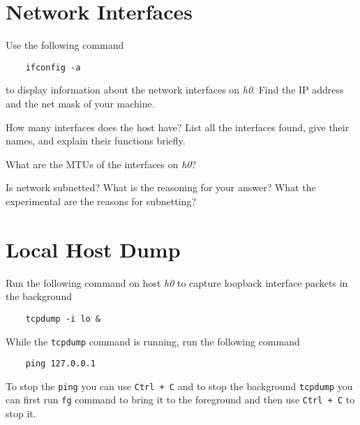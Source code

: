 \documentclass{UTNetLab}
\begin{document}
\section{Network Interfaces}

    Use the following command
    
    \begin{lstlisting}
    ifconfig -a
    \end{lstlisting}

    to display information about the network interfaces on \textit{h0}.
    Find the IP address and the net mask of your machine.
    
    \begin{report}
        \item How many interfaces does the host have?
            List all the interfaces found, give their names, and explain their functions briefly.

        \item What are the MTUs of the interfaces on \textit{h0}?

        \item Is network subnetted?
            What is the reasoning for your answer? What the experimental are the reasons for subnetting?
    \end{report}


\section{Local Host Dump}
    Run the following command on host \textit{h0} to capture loopback interface packets in the background

    \begin{lstlisting}
    tcpdump -i lo &
    \end{lstlisting}

    While the \lstinline{tcpdump} command is running, run the following command

    \begin{lstlisting}
    ping 127.0.0.1
    \end{lstlisting}

    To stop the \lstinline{ping} you can use \texttt{Ctrl + C} and to stop the background \lstinline{tcpdump} you can first run \lstinline{fg} command to bring it to the foreground and then use \texttt{Ctrl + C} to stop it.
\end{document}
